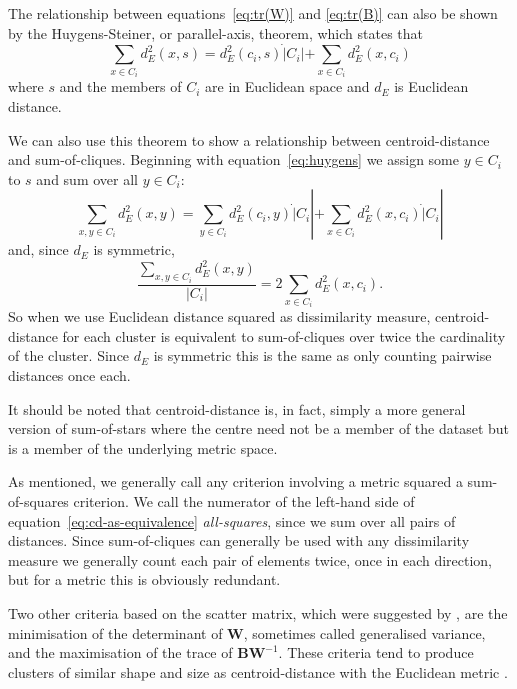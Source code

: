 \documentclass[a4paper]{report}
\begin{document}
The relationship between equations~\eqref{eq:tr(W)} and \eqref{eq:tr(B)} can
also be shown by the Huygens-Steiner, or parallel-axis, theorem, which states
that
\begin{equation}
  \label{eq:huygens}
  \sum_{x \in C_i} d_E^2(x,s) = d_E^2(c_i,s) \dot |C_i| +
                             \sum_{x \in C_i} d_E^2(x,c_i)
\end{equation}
where $s$ and the members of $C_i$ are in Euclidean space and $d_E$ is
Euclidean distance.

We can also use this theorem to show a relationship between centroid-distance
and sum-of-cliques.  Beginning with equation~\eqref{eq:huygens} we assign some
$y \in C_i$ to $s$ and sum over all $y \in C_i$:
\begin{equation*}
  \sum_{x,y \in C_i} d_E^2(x,y) = \sum_{y \in C_i} d_E^2(c_i,y) \dot |C_i|
                           + \sum_{x \in C_i} d_E^2(x,c_i) \dot |C_i|
\end{equation*}
and, since $d_E$ is symmetric,
\begin{equation}
  \label{eq:cd-as-equivalence}
  \frac{\displaystyle \sum_{x,y \in C_i} d_E^2(x,y)}
       {|C_i|}
  = 2 \sum_{x \in C_i} d_E^2(x,c_i).
\end{equation}
So when we use Euclidean distance squared as dissimilarity measure,
centroid-distance for each cluster is equivalent to sum-of-cliques over twice
the cardinality of the cluster.  Since $d_E$ is symmetric this is the same as
only counting pairwise distances once each.

It should be noted that centroid-distance is, in fact, simply a more general
version of sum-of-stars where the centre need not be a member of the dataset
but is a member of the underlying metric space.

As mentioned, we generally call any criterion involving a metric squared a
sum-of-squares criterion.  We call the numerator of the left-hand side of
equation~\eqref{eq:cd-as-equivalence} \textit{all-squares}, since we sum over
all pairs of distances.  Since sum-of-cliques can generally be used with any
dissimilarity measure we generally count each pair of elements twice, once in
each direction, but for a metric this is obviously redundant.

Two other criteria based on the scatter matrix, which were suggested by
\citet{friedman1967criteria}, are the minimisation of the determinant of
$\mathbf{W}$, sometimes called generalised variance, and the maximisation of
the trace of $\mathbf{BW}^{-1}$.  These criteria tend to produce clusters of
similar shape and size as centroid-distance with the Euclidean metric
\citep{marriott1982optimization}.
\end{document}
